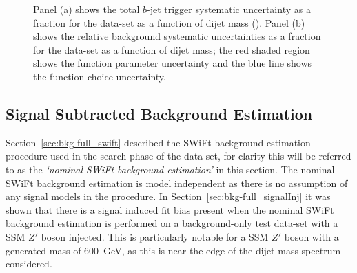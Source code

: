 \begin{figure}[!ht]
  \begin{center}
    \captionsetup[subfigure]{aboveskip=0pt,justification=centering}
    \hspace{-0.2cm}
  \end{center}
  \vspace{-1em}
  \caption[The $b$-jet trigger and background systematic uncertainties for the \lm{} data-set as a function of dijet mass.]
    {Panel (a) shows the total $b$-jet trigger systematic uncertainty as a fraction for the \lm{} data-set as a function of dijet mass (\mjj).
    Panel (b) shows the relative background systematic uncertainties as a fraction for the \lm{} data-set as a function of dijet mass;
    the red shaded region shows the function parameter uncertainty and the blue line shows the function choice uncertainty.}
  \label{fig:lim-lowmass_syst}
\end{figure}

\FloatBarrier
\subsection{Signal Subtracted Background Estimation}
\label{sec:lim-full_ssb}

Section~\ref{sec:bkg-full_swift} described the SWiFt background estimation procedure used in the search phase of the \lm{} data-set, 
for clarity this will be referred to as the \textit{`nominal SWiFt background estimation'} in this section.
The nominal SWiFt background estimation is model independent as there is no assumption of any signal models in the procedure.
In Section~\ref{sec:bkg-full_signalInj} it was shown that there is a signal induced fit bias present when
the nominal SWiFt background estimation is performed on a background-only test data-set with a SSM $Z'$ boson injected.
This is particularly notable for a SSM $Z'$ boson with a generated mass of 600~GeV,
as this is near the edge of the dijet mass spectrum considered.

